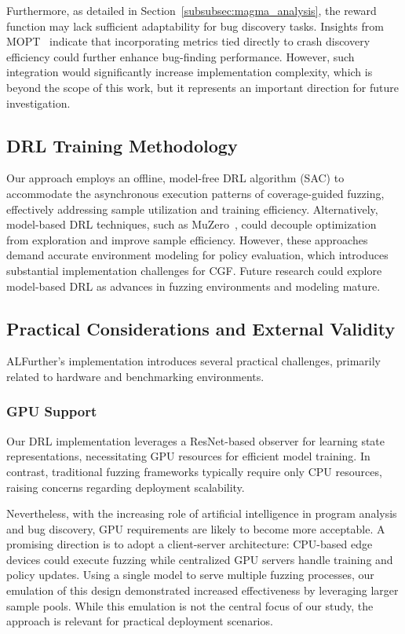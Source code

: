 \documentclass[lettersize,journal]{IEEEtran}
\begin{document}
Furthermore, as detailed in Section~\ref{subsubsec:magma_analysis}, the reward function may lack sufficient adaptability for bug discovery tasks. Insights from MOPT~\cite{lyuMOPTOptimizedMutation2019} indicate that incorporating metrics tied directly to crash discovery efficiency could further enhance bug-finding performance. However, such integration would significantly increase implementation complexity, which is beyond the scope of this work, but it represents an important direction for future investigation.

\subsection{DRL Training Methodology}
Our approach employs an offline, model-free DRL algorithm (SAC) to accommodate the asynchronous execution patterns of coverage-guided fuzzing, effectively addressing sample utilization and training efficiency. Alternatively, model-based DRL techniques, such as MuZero~\cite{schrittwieserMasteringAtariGo2020}, could decouple optimization from exploration and improve sample efficiency. However, these approaches demand accurate environment modeling for policy evaluation, which introduces substantial implementation challenges for CGF. Future research could explore model-based DRL as advances in fuzzing environments and modeling mature.

\subsection{Practical Considerations and External Validity}
ALFurther’s implementation introduces several practical challenges, primarily related to hardware and benchmarking environments.

\subsubsection{GPU Support}
Our DRL implementation leverages a ResNet-based observer for learning state representations, necessitating GPU resources for efficient model training. In contrast, traditional fuzzing frameworks typically require only CPU resources, raising concerns regarding deployment scalability. 

Nevertheless, with the increasing role of artificial intelligence in program analysis and bug discovery, GPU requirements are likely to become more acceptable. A promising direction is to adopt a client-server architecture: CPU-based edge devices could execute fuzzing while centralized GPU servers handle training and policy updates. Using a single model to serve multiple fuzzing processes, our emulation of this design demonstrated increased effectiveness by leveraging larger sample pools. While this emulation is not the central focus of our study, the approach is relevant for practical deployment scenarios.
\end{document}
